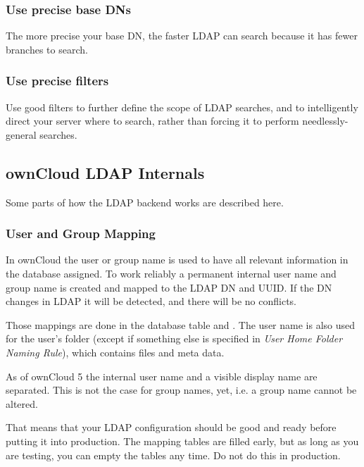 \documentclass[letterpaper,10pt,english]{sphinxmanual}
\begin{document}
\subsubsection{Use precise base DNs}
\label{configuration_user/user_auth_ldap:use-precise-base-dns}
The more precise your base DN, the faster LDAP can search because it has fewer branches to search.


\subsubsection{Use precise filters}
\label{configuration_user/user_auth_ldap:use-precise-filters}
Use good filters to further define the scope of LDAP searches, and to intelligently direct your server where to search, rather than forcing it to perform needlessly-general searches.


\subsection{ownCloud LDAP Internals}
\label{configuration_user/user_auth_ldap:owncloud-ldap-internals}
Some parts of how the LDAP backend works are described here.


\subsubsection{User and Group Mapping}
\label{configuration_user/user_auth_ldap:user-and-group-mapping}
In ownCloud the user or group name is used to have all relevant information in
the database assigned. To work reliably a permanent internal user name and
group name is created and mapped to the LDAP DN and UUID. If the DN changes in
LDAP it will be detected, and there will be no conflicts.

Those mappings are done in the database table  and
. The user name is also used for the user's folder (except
if something else is specified in \emph{User Home Folder Naming Rule}), which
contains files and meta data.

As of ownCloud 5 the internal user name and a visible display name are separated.
This is not the case for group names, yet, i.e. a group name cannot be altered.

That means that your LDAP configuration should be good and ready before putting
it into production. The mapping tables are filled early, but as long as you are
testing, you can empty the tables any time. Do not do this in production.
\end{document}
